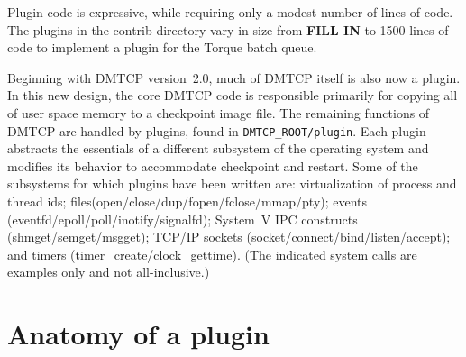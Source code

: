 \documentclass{article}
\begin{document}
Plugin code is expressive, while requiring only a modest number of lines
of code.  The plugins in the contrib directory vary in size from
{\bf FILL IN} to 1500 lines of code to implement a plugin for the
Torque batch queue.

Beginning with DMTCP version~2.0, much of DMTCP itself is also now
a plugin.  In this new design, the core DMTCP code is responsible
primarily for copying all of user space memory to a checkpoint
image file.  The remaining functions of DMTCP are handled by plugins,
found in {\tt DMTCP\_ROOT/plugin}.  Each plugin abstracts the essentials of a
different subsystem of the operating system and modifies its behavior
to accommodate checkpoint and restart.  Some of the subsystems for
which plugins have been written are: virtualization of process
and thread ids; files(open/close/dup/fopen/fclose/mmap/pty);
events (eventfd/epoll/poll/inotify/signalfd);
System~V IPC constructs (shmget/semget/msgget); TCP/IP
sockets (socket/connect/bind/listen/accept); and timers
(timer\_create/clock\_gettime).  (The indicated system calls are examples
only and not all-inclusive.)

\section{Anatomy of a plugin}
\end{document}
